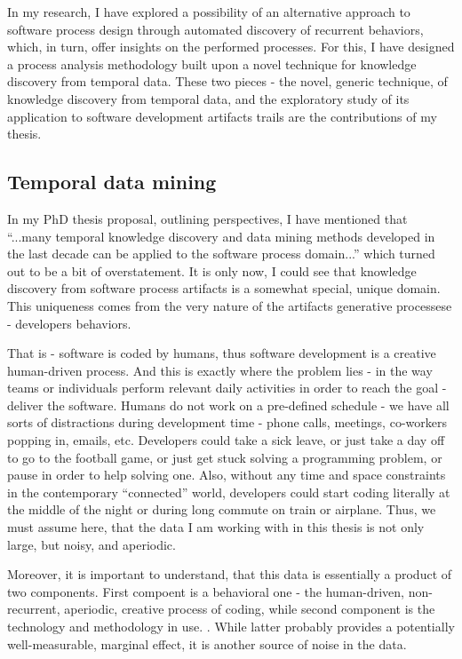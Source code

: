 \documentclass[11pt,oneside]{article}
\numberwithin{equation}{subsection}
\begin{document}
In my research, I have explored a possibility of an alternative approach to software 
process design through automated discovery of recurrent behaviors, which, in turn,
offer insights on the performed processes. For this, I have designed a process analysis 
methodology built upon a novel technique for knowledge discovery from temporal data. 
These two pieces - the novel, generic technique, of knowledge discovery from temporal data,
and the exploratory study of its application to software development artifacts trails 
are the contributions of my thesis.

\subsection{Temporal data mining}
In my PhD thesis proposal, outlining perspectives, I have mentioned that 
``...many temporal knowledge discovery and data mining methods developed in the last 
decade can be applied to the software process domain...'' 
which turned out to be a bit of overstatement. It is only now, I could
see that knowledge discovery from software process artifacts is a somewhat special,
unique domain. This uniqueness comes from the very nature of the artifacts 
generative processese - developers behaviors.

That is - software is coded by humans, thus software development is a creative human-driven 
process. And this is exactly where the problem lies - in the way teams or individuals
perform relevant daily activities in order to reach the goal - deliver the software.
Humans do not work on a pre-defined schedule - we have all sorts of distractions 
during development time - phone calls, meetings, co-workers popping in, emails, etc.
Developers could take a sick leave, or just take a day off to go to the football game,
or just get stuck solving a programming problem, or pause in order to help solving one.
Also, without any time and space constraints in the contemporary ``connected'' world,
developers could start coding literally at the middle of the night or during long 
commute on train or airplane. Thus, we must assume here, that the
data I am working with in this thesis is not only large, but noisy, and aperiodic.

Moreover, it is important to understand, that this data is essentially a product of two
components. First compoent is a behavioral one - the human-driven, non-recurrent, aperiodic,
creative process of coding, while second component is the technology and methodology in use.
.
While latter probably provides a potentially well-measurable, marginal effect, it is another 
source of noise in the data.
\end{document}

